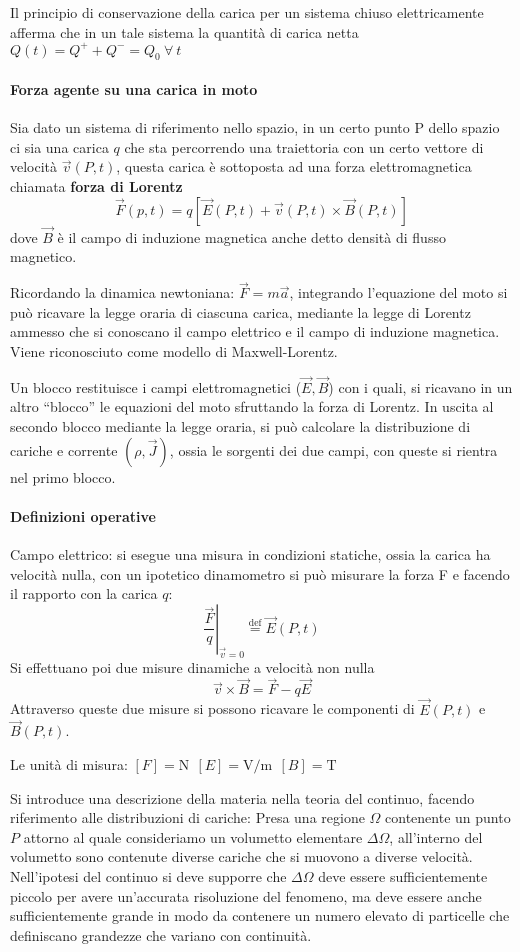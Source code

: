 Il principio di conservazione della carica per un sistema chiuso elettricamente afferma che in un tale 
sistema la quantità di carica netta $Q(t) = Q^+ + Q^- = Q_0\ \forall\ t$

\paragraph{Forza agente su una carica in moto}

Sia dato un sistema di riferimento nello spazio, in un certo punto P dello spazio ci sia una carica $q$
che sta percorrendo una traiettoria con un certo vettore di velocità $\vec{v}(P,t)$, questa
carica è sottoposta ad una forza elettromagnetica chiamata \textbf{forza di Lorentz}
$$
\vec{F}(p,t) = q\left[\vec{E}(P,t)+\vec{v}(P,t)\times\vec{B}(P,t)\right]
$$
dove $\vec{B}$ è il campo di induzione magnetica anche detto densità di flusso magnetico.

Ricordando la dinamica newtoniana: $\vec{F} = m\vec{a}$, integrando l'equazione del moto si può
ricavare la legge oraria di ciascuna carica, mediante la legge di Lorentz ammesso che si conoscano 
il campo elettrico e il campo di induzione magnetica.
Viene riconosciuto come modello di Maxwell-Lorentz.

Un blocco restituisce i campi elettromagnetici ($\vec{E},\vec{B}$) con i quali, si ricavano in un altro
``blocco'' le equazioni del moto sfruttando la forza di Lorentz.
In uscita al secondo blocco mediante la legge oraria, si può calcolare la distribuzione di cariche e 
corrente $\left(\rho,\vec{J}\right)$, ossia le sorgenti dei due campi, con queste si rientra nel primo blocco.

\paragraph{Definizioni operative}
Campo elettrico:
si esegue una misura in condizioni statiche, ossia la carica ha velocità nulla, con un ipotetico 
dinamometro si può misurare la forza F e facendo il rapporto con la carica $q$:
$$
\left.\frac{\vec{F}}{q}\right|_{\vec{v}=0} \stackrel{\text{def}}{=} \vec{E}(P,t)
$$
Si effettuano poi due misure dinamiche a velocità non nulla
$$
\vec{v}\times\vec{B} = \vec{F} - q\vec{E}
$$
Attraverso queste due misure si possono ricavare le componenti di $\vec{E}(P,t)$ e $\vec{B}(P,t)$.


Le unità di misura:
$[F] = \si{\newton}\ \  [E] = \si{\volt\per\meter} \ \ [B] = \si{\tesla}$

Si introduce una descrizione della materia nella teoria del continuo, facendo riferimento alle 
distribuzioni di cariche:
Presa una regione $\Omega$ contenente un punto $P$ attorno al quale consideriamo un volumetto elementare 
$\Delta\Omega$, all'interno del volumetto sono contenute diverse cariche che si muovono a diverse 
velocità. Nell'ipotesi del continuo si deve supporre che $\Delta \Omega$ deve essere sufficientemente piccolo
per avere un'accurata risoluzione del fenomeno, ma deve essere anche sufficientemente grande in modo da 
contenere un numero elevato di particelle che definiscano grandezze che variano con continuità.


